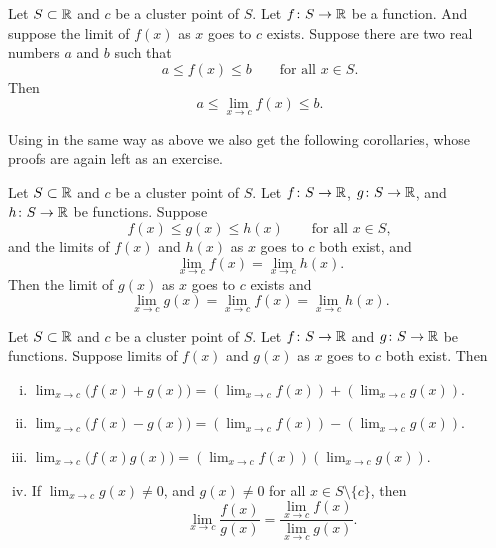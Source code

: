 \begin{cor} \label{fconstineq:cor}
Let $S \subset {\mathbb{R}}$ and $c$ be a cluster point of $S$.  Let $f \colon S \to
{\mathbb{R}}$ be a function.  And suppose the limit of $f(x)$ as $x$ goes to $c$
exists.
Suppose there are two real numbers $a$ and $b$ such that
\begin{equation*}
a \leq f(x) \leq b \qquad \text{for all $x \in S$}.
\end{equation*}
Then
\begin{equation*}
a \leq \lim_{x\to c} f(x) \leq b .
\end{equation*}
\end{cor}

Using  in the same way as above we also get
the following corollaries, whose proofs are again left as an exercise.

\begin{cor} \label{fsqueeze:cor}
Let $S \subset {\mathbb{R}}$ and $c$ be a cluster point of $S$.  Let $f \colon S \to
{\mathbb{R}}$,
$g \colon S \to {\mathbb{R}}$, and $h \colon S \to {\mathbb{R}}$ be functions.  Suppose 
\begin{equation*}
f(x) \leq g(x) \leq h(x) \qquad \text{for all $x \in S$},
\end{equation*}
and the limits of $f(x)$ and $h(x)$ as $x$ goes to $c$ both exist, and
\begin{equation*}
\lim_{x\to c} f(x) = \lim_{x\to c} h(x) .
\end{equation*}
Then the limit of $g(x)$ as $x$ goes to $c$ exists and
\begin{equation*}
\lim_{x\to c} g(x) =
\lim_{x\to c} f(x) = \lim_{x\to c} h(x) .
\end{equation*}
\end{cor}

\begin{cor} \label{falg:cor}
Let $S \subset {\mathbb{R}}$ and $c$ be a cluster point of $S$.  Let $f \colon S \to
{\mathbb{R}}$ and
$g \colon S \to {\mathbb{R}}$ be functions. 
Suppose limits of $f(x)$ and $g(x)$ as $x$ goes to $c$ both exist.
Then
\begin{enumerate}[(i)]
\item
$\displaystyle
\lim_{x\to c} \bigl(f(x)+g(x)\bigr) = \left(\lim_{x\to c} f(x)\right) + 
\left(\lim_{x\to c} g(x)\right) .
$
\item
$\displaystyle
\lim_{x\to c} \bigl(f(x)-g(x)\bigr) = \left(\lim_{x\to c} f(x)\right) -
\left(\lim_{x\to c} g(x)\right) .
$
\item
$\displaystyle
\lim_{x\to c} \bigl(f(x)g(x)\bigr) = \left(\lim_{x\to c} f(x)\right)
\left(\lim_{x\to c} g(x)\right) .
$
\item \label{falg:cor:iv} If
$\displaystyle \lim_{x\to c} g(x) \not= 0$,
and $g(x) \not= 0$ for all $x \in S \setminus \{ c \}$, then
\begin{equation*}
\lim_{x\to c} \frac{f(x)}{g(x)} =
\frac{\lim_{x\to c} f(x)}{\lim_{x\to c} g(x)} .
\end{equation*}
\end{enumerate}
\end{cor}

